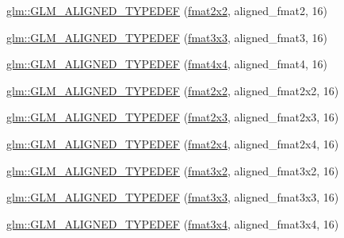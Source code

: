 \begin{DoxyCompactItemize}
\item 
\hyperlink{group__gtx__type__aligned_ga719da577361541a4c43a2dd1d0e361e1}{glm\+::\+G\+L\+M\+\_\+\+A\+L\+I\+G\+N\+E\+D\+\_\+\+T\+Y\+P\+E\+D\+EF} (\hyperlink{group__gtc__type__precision_gad3b3ab6399b8b960e8994b37521bab86}{fmat2x2}, aligned\+\_\+fmat2, 16)
\item 
\hyperlink{group__gtx__type__aligned_ga6e7ee4f541e1d7db66cd1a224caacafb}{glm\+::\+G\+L\+M\+\_\+\+A\+L\+I\+G\+N\+E\+D\+\_\+\+T\+Y\+P\+E\+D\+EF} (\hyperlink{group__gtc__type__precision_ga5bf6f06e3cac1ed82489f858a0816aaa}{fmat3x3}, aligned\+\_\+fmat3, 16)
\item 
\hyperlink{group__gtx__type__aligned_gae5d672d359f2a39f63f98c7975057486}{glm\+::\+G\+L\+M\+\_\+\+A\+L\+I\+G\+N\+E\+D\+\_\+\+T\+Y\+P\+E\+D\+EF} (\hyperlink{group__gtc__type__precision_gaeda4baa9a8e3113ff879dd5e7bdf5334}{fmat4x4}, aligned\+\_\+fmat4, 16)
\item 
\hyperlink{group__gtx__type__aligned_ga6fa2df037dbfc5fe8c8e0b4db8a34953}{glm\+::\+G\+L\+M\+\_\+\+A\+L\+I\+G\+N\+E\+D\+\_\+\+T\+Y\+P\+E\+D\+EF} (\hyperlink{group__gtc__type__precision_gad3b3ab6399b8b960e8994b37521bab86}{fmat2x2}, aligned\+\_\+fmat2x2, 16)
\item 
\hyperlink{group__gtx__type__aligned_ga0743b4f4f69a3227b82ff58f6abbad62}{glm\+::\+G\+L\+M\+\_\+\+A\+L\+I\+G\+N\+E\+D\+\_\+\+T\+Y\+P\+E\+D\+EF} (\hyperlink{group__gtc__type__precision_ga872da486765a299d84e9e8e6232ed306}{fmat2x3}, aligned\+\_\+fmat2x3, 16)
\item 
\hyperlink{group__gtx__type__aligned_ga1a76b325fdf70f961d835edd182c63dd}{glm\+::\+G\+L\+M\+\_\+\+A\+L\+I\+G\+N\+E\+D\+\_\+\+T\+Y\+P\+E\+D\+EF} (\hyperlink{group__gtc__type__precision_gabaf7537f5284456254b1da1cd6fd2b78}{fmat2x4}, aligned\+\_\+fmat2x4, 16)
\item 
\hyperlink{group__gtx__type__aligned_ga4b4e181cd041ba28c3163e7b8074aef0}{glm\+::\+G\+L\+M\+\_\+\+A\+L\+I\+G\+N\+E\+D\+\_\+\+T\+Y\+P\+E\+D\+EF} (\hyperlink{group__gtc__type__precision_gaed9c8fe9d2e094bf3bc7c606bbae1a6b}{fmat3x2}, aligned\+\_\+fmat3x2, 16)
\item 
\hyperlink{group__gtx__type__aligned_ga27b13f465abc8a40705698145e222c3f}{glm\+::\+G\+L\+M\+\_\+\+A\+L\+I\+G\+N\+E\+D\+\_\+\+T\+Y\+P\+E\+D\+EF} (\hyperlink{group__gtc__type__precision_ga5bf6f06e3cac1ed82489f858a0816aaa}{fmat3x3}, aligned\+\_\+fmat3x3, 16)
\item 
\hyperlink{group__gtx__type__aligned_ga2608d19cc275830a6f8c0b6405625a4f}{glm\+::\+G\+L\+M\+\_\+\+A\+L\+I\+G\+N\+E\+D\+\_\+\+T\+Y\+P\+E\+D\+EF} (\hyperlink{group__gtc__type__precision_gab2daf8468a8b9343c065816df07e29fe}{fmat3x4}, aligned\+\_\+fmat3x4, 16)

\end{DoxyCompactItemize}
